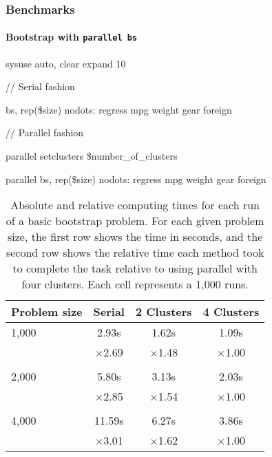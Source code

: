 \documentclass[9pt,\ExtraDocOpts]{beamer}
\begin{document}
\begin{frame}[t]
\frametitle{Benchmarks}
\framesubtitle{Bootstrap with \tt{parallel bs}}
\begin{semiverbatim}
	\scriptsize
sysuse auto, clear
expand 10


// Serial fashion

bs, rep(\$size) nodots: regress mpg weight gear foreign


// Parallel fashion

parallel setclusters \$number\_of\_clusters

parallel bs, rep(\$size) nodots: regress mpg weight gear foreign
\end{semiverbatim}
\pause{}

\begin{table}[!h]
\centering\begin{tabular}{l*{3}{c}}
	\toprule
	Problem size & Serial & 2 Clusters & 4 Clusters\\\midrule
	1,000 &   2.93s &   1.62s &   1.09s \\    
	&  $\times$2.69 &  $\times$1.48 &  $\times$1.00 \\ \\
	2,000 &   5.80s &   3.13s &   2.03s \\    
	&  $\times$2.85 &  $\times$1.54 &  $\times$1.00 \\ \\
	4,000 &  11.59s &   6.27s &   3.86s \\    
	&  $\times$3.01 &  $\times$1.62 &  $\times$1.00 \\
	\bottomrule
\end{tabular}
\caption{Absolute and relative computing times for each run of a basic bootstrap problem. For each given problem size, the first row shows the time in seconds, and the second row shows the relative time each method took to complete the task relative to using parallel with four clusters. Each cell represents a 1,000 runs.}
	\end{table}
	
\end{frame}
\end{document}
